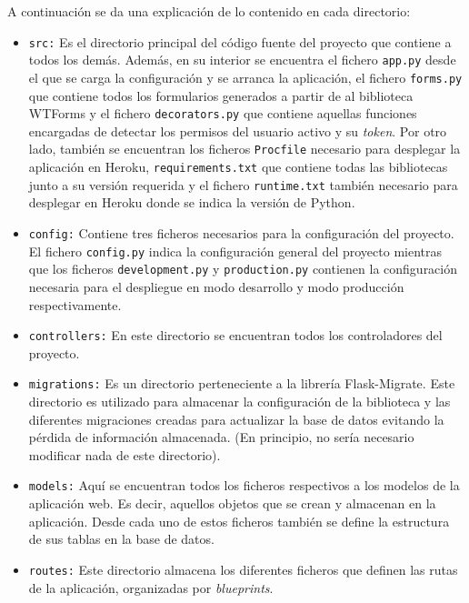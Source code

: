 A continuación se da una explicación de lo contenido en cada directorio:
\begin{itemize}
\item \texttt{src:} 
Es el directorio principal del código fuente del proyecto que contiene a todos los demás. 
Además, en su interior se encuentra el fichero \texttt{app.py} desde el que se carga la configuración y se arranca la aplicación, el fichero \texttt{forms.py} que contiene todos los formularios generados a partir de al biblioteca WTForms y el fichero \texttt{decorators.py} que contiene aquellas funciones encargadas de detectar los permisos del usuario activo y su \textit{token}.
Por otro lado, también se encuentran los ficheros \texttt{Procfile} necesario para desplegar la aplicación en Heroku, \texttt{requirements.txt} que contiene todas las bibliotecas junto a su versión requerida y el fichero \texttt{runtime.txt} también necesario para desplegar en Heroku donde se indica la versión de Python.

\item \texttt{config:} 
Contiene tres ficheros necesarios para la configuración del proyecto.
El fichero \texttt{config.py} indica la configuración general del proyecto mientras que los ficheros \texttt{development.py} y \texttt{production.py} contienen la configuración necesaria para el despliegue en modo desarrollo y modo producción respectivamente.

\item \texttt{controllers:}
En este directorio se encuentran todos los controladores del proyecto.

\item \texttt{migrations:}
Es un directorio perteneciente a la librería Flask-Migrate. 
Este directorio es utilizado para almacenar la configuración de la biblioteca y las diferentes migraciones creadas para actualizar la base de datos evitando la pérdida de información almacenada. (En principio, no sería necesario modificar nada de este directorio).

\item \texttt{models:}
Aquí se encuentran todos los ficheros respectivos a los modelos de la aplicación web. Es decir, aquellos objetos que se crean y almacenan en la aplicación.
Desde cada uno de estos ficheros también se define la estructura de sus tablas en la base de datos.

\item \texttt{routes:}
Este directorio almacena los diferentes ficheros que definen las rutas de la aplicación, organizadas por \textit{blueprints}.


\end{itemize}
